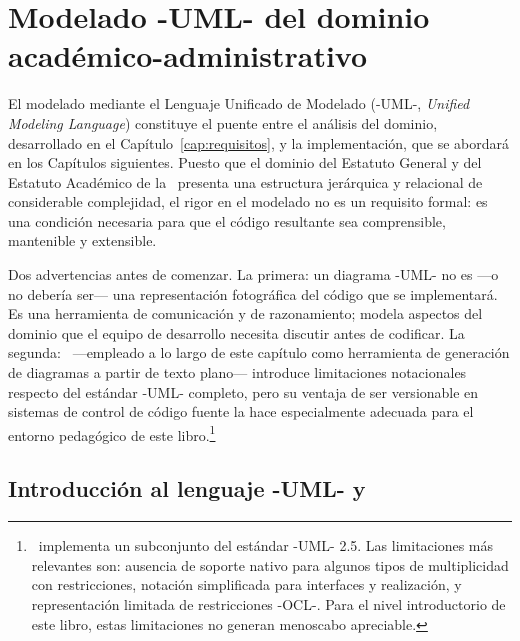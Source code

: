 
\chapter{Modelado -UML- del dominio académico-administrativo}
\label{cap:uml}

\noindent
El modelado mediante el Lenguaje Unificado de Modelado (-UML-,
\textit{Unified Modeling Language}) constituye el puente entre el análisis
del dominio, desarrollado en el Capítulo~\ref{cap:requisitos}, y la
implementación, que se abordará en los Capítulos siguientes. Puesto que
el dominio del Estatuto General y del Estatuto Académico de la \ud\
presenta una estructura jerárquica y relacional de considerable complejidad,
el rigor en el modelado no es un requisito formal: es una condición
necesaria para que el código resultante sea comprensible, mantenible
y extensible.

Dos advertencias antes de comenzar. La primera: un diagrama -UML- no es
---o no debería ser--- una representación fotográfica del código que se
implementará. Es una herramienta de comunicación y de razonamiento; modela
aspectos del dominio que el equipo de desarrollo necesita discutir antes
de codificar. La segunda: \plantuml\ ---empleado a lo largo de este capítulo
como herramienta de generación de diagramas a partir de texto plano---
introduce limitaciones notacionales respecto del estándar -UML-
completo, pero su ventaja de ser versionable en sistemas de control de
código fuente la hace especialmente adecuada para el entorno pedagógico
de este libro.\footnote{%
  \plantuml\ implementa un subconjunto del estándar -UML- 2.5. Las limitaciones
  más relevantes son: ausencia de soporte nativo para algunos tipos de
  multiplicidad con restricciones, notación simplificada para interfaces
  y realización, y representación limitada de restricciones -OCL-. Para el
  nivel introductorio de este libro, estas limitaciones no generan
  menoscabo apreciable.}

\section{Introducción al lenguaje -UML- y \plantuml}
\label{sec:uml-intro}


